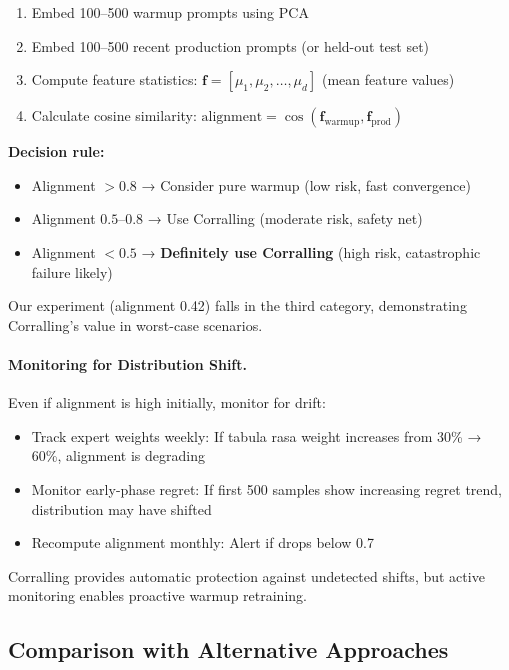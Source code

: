 \begin{center}
\begin{enumerate}[leftmargin=*,nosep]
    \item Embed 100--500 warmup prompts using PCA
    \item Embed 100--500 recent production prompts (or held-out test set)
    \item Compute feature statistics: $\mathbf{f} = [\mu_1, \mu_2, \ldots, \mu_d]$ (mean feature values)
    \item Calculate cosine similarity: $\text{alignment} = \cos(\mathbf{f}_{\text{warmup}}, \mathbf{f}_{\text{prod}})$
\end{enumerate}

\textbf{Decision rule:}
\begin{itemize}[leftmargin=*,nosep]
    \item Alignment $>0.8$ → Consider pure warmup (low risk, fast convergence)
    \item Alignment $0.5$--$0.8$ → Use Corralling (moderate risk, safety net)
    \item Alignment $<0.5$ → \textbf{Definitely use Corralling} (high risk, catastrophic failure likely)
\end{itemize}

Our experiment (alignment 0.42) falls in the third category, demonstrating Corralling's value in worst-case scenarios.

\paragraph{Monitoring for Distribution Shift.}
Even if alignment is high initially, monitor for drift:

\begin{itemize}[leftmargin=*,nosep]
    \item Track expert weights weekly: If tabula rasa weight increases from 30\% → 60\%, alignment is degrading
    \item Monitor early-phase regret: If first 500 samples show increasing regret trend, distribution may have shifted
    \item Recompute alignment monthly: Alert if drops below 0.7
\end{itemize}

Corralling provides automatic protection against undetected shifts, but active monitoring enables proactive warmup retraining.

\subsection{Comparison with Alternative Approaches}


\end{center}
